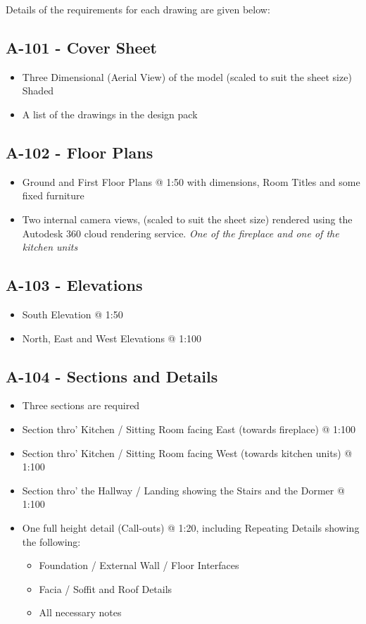 Details of the requirements for each drawing are given below:\\

\subsection*{A-101 - Cover Sheet}
\begin{itemize}
	\item Three Dimensional (Aerial View) of the model (scaled to suit the sheet size) Shaded
	\item A list of the drawings in the design pack
\end{itemize}


\subsection*{A-102 - Floor Plans}
\begin{itemize}
	\item Ground and First Floor Plans @ 1:50 with dimensions, Room Titles and some fixed furniture
	\item Two internal camera views, (scaled to suit the sheet size) rendered using the Autodesk 360 cloud rendering service.  \textit{One of the fireplace and one of the kitchen units} 
\end{itemize}


\subsection*{A-103 - Elevations}
\begin{itemize}
	\item South Elevation @ 1:50
	\item North, East and West Elevations @ 1:100
\end{itemize}

\subsection*{A-104 - Sections and Details}
\begin{itemize}
	\item Three sections are required
	\item Section thro' Kitchen / Sitting Room facing East (towards fireplace) @ 1:100
	\item Section thro' Kitchen / Sitting Room facing West (towards kitchen units) @ 1:100
	\item Section thro' the Hallway / Landing showing the Stairs and the Dormer @ 1:100
	\item One full height detail (Call-outs) @ 1:20, including Repeating Details showing the following:
	\begin{itemize}
		\item Foundation / External Wall / Floor Interfaces
		\item Facia / Soffit and Roof Details
		\item All necessary notes
	\end{itemize} 
\end{itemize}

